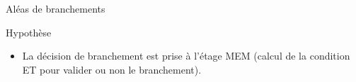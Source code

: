 %
\begin{Frame}{Aléas de branchements}

\begin{block}{Hypothèse}
       \begin{center}
 	\begin{itemize}
          \item La décision de branchement est prise à l'étage MEM (calcul de la condition ET pour valider ou non le branchement).
        \end{itemize}
       \end{center}
      \end{block}   

\vspace{-0.1cm}
        \begin{center}
        \end{center}
 


\end{Frame}


